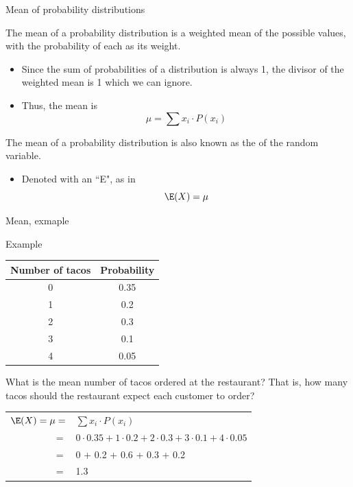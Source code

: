 \documentclass[xcolor=table, handout]{beamer}
\begin{document}
\begin{frame}{Mean of probability distributions}
\begin{block}{}
The mean of a probability distribution is a weighted mean of the possible values, with the probability of each as its weight. 
\begin{itemize}
\pause\item Since the sum of probabilities of a distribution is always 1, the divisor of the weighted mean is 1 which we can ignore.
\pause\item Thus, the mean is
\[\mu = \sum x_i \cdot P(x_i) \]
\end{itemize}
\medskip
\pause
The mean of a probability distribution is also known as the  of the random variable.
\begin{itemize}
\item Denoted with an ``E", as in 
\[\E(X) = \mu \]
\end{itemize}
\end{block}
\end{frame}

\begin{frame}{Mean, exmaple}
\begin{exampleblock}{Example}
{\centering \renewcommand{\arraystretch}{1}
\begin{tabular}{c | c}
Number of tacos & Probability\\
\hline
0 & 0.35\\
1 & 0.2\\
2 & 0.3\\
3 & 0.1\\
4 & 0.05
\end{tabular}\par
\renewcommand{\arraystretch}{1.5}}
\bigskip

What is the mean number of tacos ordered at the restaurant? That is, how many tacos should the restaurant expect each customer to order?\\
\medskip
\pause
{\centering \renewcommand{\arraystretch}{1}
\begin{tabular}{r l}
$\E(X) = \mu =$ & $\sum x_i \cdot P(x_i)$\\
$=$ & $0 \cdot 0.35 + 1 \cdot 0.2 + 2 \cdot 0.3 + 3 \cdot 0.1 + 4 \cdot 0.05$\\
$=$ & 0 + 0.2 + 0.6 + 0.3 + 0.2\\
$=$ & 1.3
\end{tabular}\par
\renewcommand{\arraystretch}{1.5}}

\end{exampleblock}
\end{frame}
\end{document}
